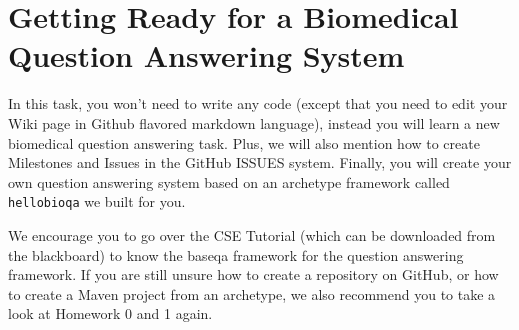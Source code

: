
\chapter{Getting Ready for a Biomedical Question Answering System}

In this task, you won't need to write any code (except that you need to edit
your Wiki page in Github flavored markdown language), instead you will learn a
new biomedical question answering task. Plus, we will also mention how to create
Milestones and Issues in the GitHub ISSUES system. Finally, you will create your
own question answering system based on an archetype framework called
\texttt{hellobioqa} we built for you.

We encourage you to go over the CSE Tutorial (which can be downloaded from the
blackboard) to know the baseqa framework for the question answering framework.
If you are still unsure how to create a repository on GitHub, or how to create a
Maven project from an archetype, we also recommend you to take a look at
Homework 0 and 1 again.






